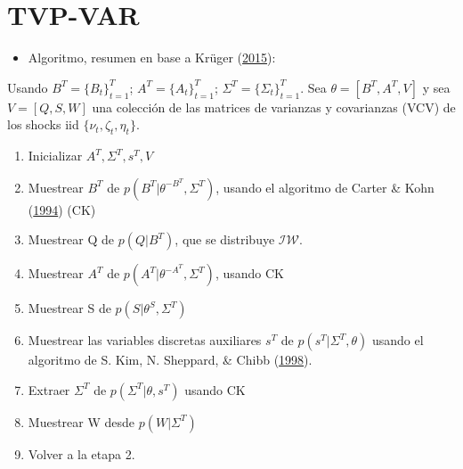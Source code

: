 \documentclass[12pt,oneside]{reedthesis}
\providecommand{\tightlist}{%
  \setlength{\itemsep}{0pt}\setlength{\parskip}{0pt}}
\begin{document}
\hypertarget{tvp-var-2}{%
\section{TVP-VAR}\label{tvp-var-2}}
\begin{itemize}
\tightlist
\item
  Algoritmo, resumen en base a Krüger (\protect\hyperlink{ref-Kruger2015}{2015}):
\end{itemize}
Usando \(B^T= \{B_t\}_{t=1}^T\); \(A^T= \{A_t\}_{t=1}^T\); \(\Sigma^T= \{\Sigma_t\}_{t=1}^T\). Sea \(\theta = [B^T, A^T, V]\) y sea \(V = [Q, S, W]\) una colección de las matrices de varianzas y covarianzas (VCV) de los shocks iid \(\{\nu_t,\zeta_t, \eta_t\}\).
\begin{enumerate}
\def\labelenumi{\arabic{enumi}.}
\tightlist
\item
  Inicializar \(A^T, \Sigma^T, s^T, V\)
\item
  Muestrear \(B^T\) de \(p(B^T|\theta^{-B^T}, \Sigma^T)\), usando el algoritmo de Carter \& Kohn (\protect\hyperlink{ref-KarterKohn1994}{1994}) (CK)
\item
  Muestrear Q de \(p(Q|B^T)\), que se distribuye \(\mathcal{IW}\).
\item
  Muestrear \(A^T\) de \(p(A^T|\theta^{-A^T}, \Sigma^T)\), usando CK
\item
  Muestrear S de \(p(S|\theta^S, \Sigma^T)\)
\item
  Muestrear las variables discretas auxiliares \(s^T\) de \(p(s^T|\Sigma^T, \theta)\) usando el algoritmo de S. Kim, N. Sheppard, \& Chibb (\protect\hyperlink{ref-Kim1998}{1998}).
\item
  Extraer \(\Sigma^T\) de \(p(\Sigma^T|\theta, s^T)\) usando CK
\item
  Muestrear W desde \(p(W|\Sigma^T)\)
\item
  Volver a la etapa 2.
\end{enumerate}
\end{document}
